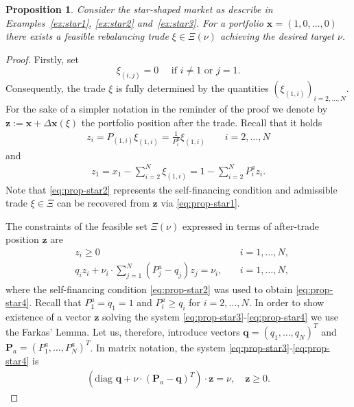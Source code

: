\documentclass{article}
\newtheorem{proposition}[theorem]{Proposition}
\theoremstyle{definition}
\def\bx{\mathbf{x}}
\def\bz{\mathbf{z}}
\def\bq{\mathbf{q}}
\def\bP{\mathbf{P}}
\begin{document}
\begin{proposition}\label{prop:star}
Consider the \emph{star-shaped market} as describe in Examples~\ref{ex:star1}, \ref{ex:star2} and~\ref{ex:star3}. For a portfolio $\bx = (1, 0, \dots, 0)$ there exists a feasible rebalancing trade $\xi \in \Xi(\nu)$ achieving the desired target $\nu$.
\end{proposition}
\begin{proof}
Firstly, set
\[
\xi_{(i,j)} = 0 \quad \text{ if } i \neq 1 \text{ or } j=1. 
\]
Consequently, the trade $\xi$ is fully determined by the quantities $(\xi_{(1,i)})_{i=2, \dots, N}$. For the sake of a simpler notation in the reminder of the proof we denote by $\bz := \bx + \Delta \bx (\xi)$ the portfolio position after the trade. Recall that it holds
\begin{align} \label{eq:prop-star1}
    z_i = P_{(1, i)} \xi_{(1, i)} = \frac{1}{P^a_i} \xi_{(1, i)} \quad \quad  i =2, \dots, N
\end{align}
and 
\begin{align} \label{eq:prop-star2}
    z_1 = x_1 - \sum_{i=2}^N \xi_{(1, i)} = 1 - \sum_{i=2}^N P^a_i z_i.
\end{align}
Note that \eqref{eq:prop-star2} represents the self-financing condition and admissible trade $\xi \in \Xi$ can be recovered from $\bz$ via \eqref{eq:prop-star1}.

The constraints of the feasible set $\Xi(\nu)$ expressed in terms of after-trade position $\bz$ are
\begin{align}
&z_i \geq 0 \quad &i = 1, \dots, N, \label{eq:prop-star3}\\
&q_i z_i + \nu_i \cdot \sum_{j=1}^N (P^a_j - q_j) z_j = \nu_i, \quad &i = 1, \dots, N, \label{eq:prop-star4}
\end{align}
where the self-financing condition \eqref{eq:prop-star2} was used to obtain \eqref{eq:prop-star4}.
Recall that $P^a_1 = q_1 = 1$ and $P^a_i \geq q_i$ for $i = 2, \dots, N$. In order to show existence of a vector $\bz$ solving the system \eqref{eq:prop-star3}-\eqref{eq:prop-star4} we use the Farkas' Lemma. Let us, therefore, introduce vectors  $\bq = (q_1, \dots, q_N)^T$ and $\bP_a = (P^a_1, \dots, P^a_N)^T$. In matrix notation, the system \eqref{eq:prop-star3}-\eqref{eq:prop-star4} is
\begin{align} \label{eq:prop-star5}
\left( \text{diag } \bq + \nu \cdot (\bP_a - \bq)^T \right) \cdot \bz = \nu, \quad \bz \geq 0.  
\end{align}


\end{proof}
\end{document}
